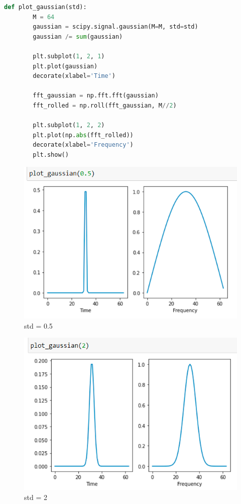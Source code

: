 \documentclass[a4paper]{article}
\begin{document}
        \begin{lstlisting}[language=Python,caption=Plotting function,label={lst:part1_2}]
    def plot_gaussian(std):
        M = 64
        gaussian = scipy.signal.gaussian(M=M, std=std)
        gaussian /= sum(gaussian)
        
        plt.subplot(1, 2, 1)
        plt.plot(gaussian)
        decorate(xlabel='Time')
    
        fft_gaussian = np.fft.fft(gaussian)
        fft_rolled = np.roll(fft_gaussian, M//2)
        
        plt.subplot(1, 2, 2)
        plt.plot(np.abs(fft_rolled))
        decorate(xlabel='Frequency')
        plt.show()
        \end{lstlisting}
        
        \begin{figure}[H]
            \centering
            \includegraphics[width=\textwidth]{img/p2_1.png}
            \caption{std = 0.5}
            \label{fig:part1_1_2}
        \end{figure}
        
        \begin{figure}[H]
            \centering
            \includegraphics[width=\textwidth]{img/p2_2.png}
            \caption{std = 2}
            \label{fig:part1_1_2}
        \end{figure}
        
\end{document}
